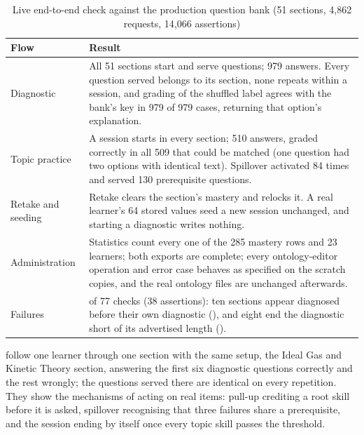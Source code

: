 \begin{table}[htbp]
  \centering
  \caption{Live end-to-end check against the production question bank (51 sections, 4{,}862 requests, 14{,}066 assertions)}
  \label{tab:live-check}
  \begin{tabularx}{\textwidth}{>{\hsize}Y>{\hsize}Y}
    \toprule
    Flow & Result \\
    \midrule
    Diagnostic & All 51 sections start and serve questions; 979 answers. Every question served belongs to its section, none repeats within a session, and grading of the shuffled label agrees with the bank's key in 979 of 979 cases, returning that option's explanation. \\
    Topic practice & A session starts in every section; 510 answers, graded correctly in all 509 that could be matched (one question had two options with identical text). Spillover activated 84 times and served 130 prerequisite questions. \\
    Retake and seeding & Retake clears the section's mastery and relocks it. A real learner's 64 stored values seed a new session unchanged, and starting a diagnostic writes nothing. \\
    Administration & Statistics count every one of the 285 mastery rows and 23 learners; both exports are complete; every ontology-editor operation and error case behaves as specified on the scratch copies, and the real ontology files are unchanged afterwards. \\
    Failures & 4 of 77 checks (38 assertions): ten sections appear diagnosed before their own diagnostic (), and eight end the diagnostic short of its advertised length (). \\
    \bottomrule
  \end{tabularx}
\end{table}

 follow one learner through one section
with the same setup, the Ideal Gas and Kinetic Theory section, answering the
first six diagnostic questions correctly and the rest wrongly; the questions
served there are identical on every repetition. They show the mechanisms of
acting on real items: pull-up crediting a root skill before it is asked,
spillover recognising that three failures share a prerequisite, and the session
ending by itself once every topic skill passes the threshold.




